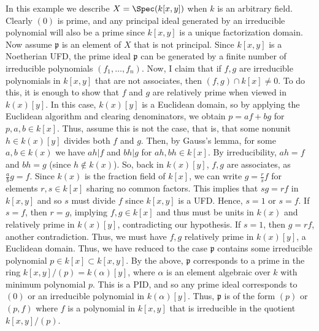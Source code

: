 \begin{example}
\label{example-spec-kxy}
In this example we describe $X = \Spec(k[x, y])$
when $k$ is an arbitrary field.
Clearly $(0)$ is prime, and any principal ideal generated by an
irreducible polynomial will also be a prime since $k[x, y]$ is a
unique factorization domain. Now assume $\mathfrak p$ is an
element of $X$ that is not principal. Since $k[x, y]$ is a
Noetherian UFD, the prime ideal $\mathfrak p$ can be generated
by a finite number of irreducible polynomials $(f_1, \ldots, f_n)$.
Now, I claim that if $f, g$ are irreducible polynomials in $k[x, y]$
that are not associates, then $(f, g) \cap k[x] \neq 0$. To do this,
it is enough to show that $f$ and $g$ are relatively prime when
viewed in $k(x)[y]$. In this case, $k(x)[y]$ is a Euclidean domain,
so by applying the Euclidean algorithm and clearing denominators, we
obtain $p = af + bg$ for $p, a, b \in k[x]$. Thus, assume this is not
the case, that is, that some nonunit $h \in k(x)[y]$ divides both
$f$ and $g$. Then, by Gauss's lemma, for some $a, b \in k(x)$ we
have $ah | f$ and $bh | g$ for $ah, bh \in k[x]$. By
irreducibility, $ah = f$ and
$bh = g$ (since $h \notin k(x)$). So, back in $k(x)[y]$, $f, g $
are associates, as $\frac{a}{b} g = f$. Since
$k(x)$ is the fraction field of $k[x]$, we can write $g = \frac{r}{s} f $
for elements $r , s \in k[x]$ sharing no common factors. This
implies that $sg = rf$ in $k[x, y]$ and so $s$ must divide $f$
since $k[x, y]$ is a UFD. Hence, $s = 1$ or $s = f$. If $s = f$,
then $r = g$, implying $f, g \in k[x]$ and thus must be units in
$k(x)$ and relatively prime in $k(x)[y]$, contradicting our
hypothesis. If $s = 1$, then $g = rf$, another contradiction.
Thus, we must have $f, g$ relatively prime in $k(x)[y]$, a
Euclidean domain. Thus, we have reduced to the case $\mathfrak p$
contains some irreducible polynomial $p \in k[x] \subset k[x, y]$.
By the above, $\mathfrak p$ corresponds to a prime in the ring
$k[x, y]/(p) = k(\alpha)[y]$, where $\alpha$ is an element
algebraic over $k$ with minimum polynomial $p$. This is a
PID, and so any prime ideal corresponds to $(0)$ or an
irreducible polynomial in $k(\alpha)[y]$. Thus, $\mathfrak p$
is of the form $(p)$ or $(p, f)$ where $f$ is a
polynomial in $k[x, y]$ that is irreducible in the quotient
$k[x, y]/(p)$.
\end{example}